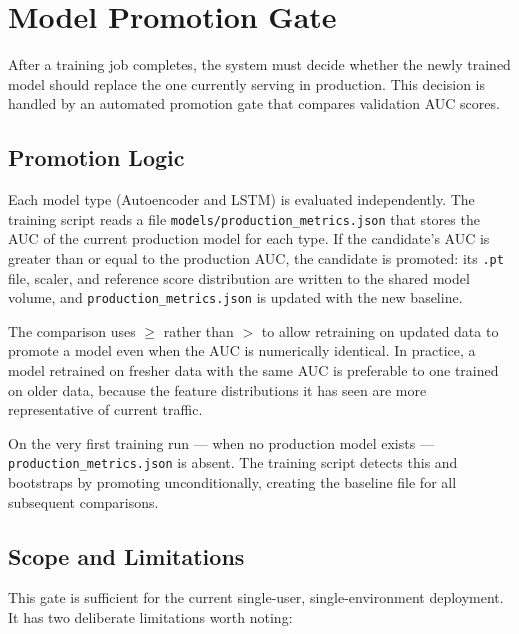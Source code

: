 \section{Model Promotion Gate}
\label{sec:promotion-gate}

After a training job completes, the system must decide whether the newly
trained model should replace the one currently serving in production. This
decision is handled by an automated promotion gate that compares validation
AUC scores.

\subsection{Promotion Logic}

Each model type (Autoencoder and LSTM) is evaluated independently. The
training script reads a file \texttt{models/production\_metrics.json} that
stores the AUC of the current production model for each type. If the
candidate's AUC is greater than or equal to the production AUC, the
candidate is promoted: its \texttt{.pt} file, scaler, and reference score
distribution are written to the shared model volume, and
\texttt{production\_metrics.json} is updated with the new baseline.

The comparison uses $\geq$ rather than $>$ to allow retraining on updated
data to promote a model even when the AUC is numerically identical. In
practice, a model retrained on fresher data with the same AUC is preferable
to one trained on older data, because the feature distributions it has seen
are more representative of current traffic.

On the very first training run --- when no production model exists ---
\texttt{production\_metrics.json} is absent. The training script detects
this and bootstraps by promoting unconditionally, creating the baseline
file for all subsequent comparisons.

\subsection{Scope and Limitations}

This gate is sufficient for the current single-user, single-environment
deployment. It has two deliberate limitations worth noting:

